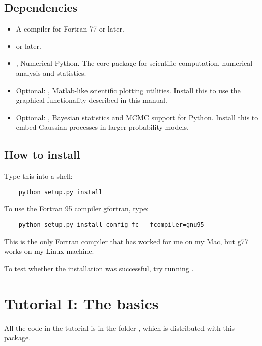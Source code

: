 \documentclass{manual}
\begin{document}
\section{Dependencies}
\begin{itemize}
    \item A compiler for Fortran 77 or later.
    \item {} or later.
    \item {}, Numerical Python. The core package for scientific computation, numerical analysis and statistics.
    \item Optional: , Matlab-like scientific plotting utilities. Install this to use the graphical functionality described in this manual.
    \item Optional: , Bayesian statistics and MCMC support for Python. Install this to embed Gaussian processes in larger probability models.
\end{itemize} 

\section{How to install}\label{sec:installing}

Type this into a shell:
\begin{verbatim}
    python setup.py install
\end{verbatim}
To use the Fortran 95 compiler gfortran, type:
\begin{verbatim}
    python setup.py install config_fc --fcompiler=gnu95
\end{verbatim}
This is the only Fortran compiler that has worked for me on my Mac, but g77 works on my Linux machine.

To test whether the installation was successful, try running .


\chapter{Tutorial I: The basics}\label{cha:basics} %

All the code in the tutorial is in the folder , which is distributed with this package.
\end{document}
